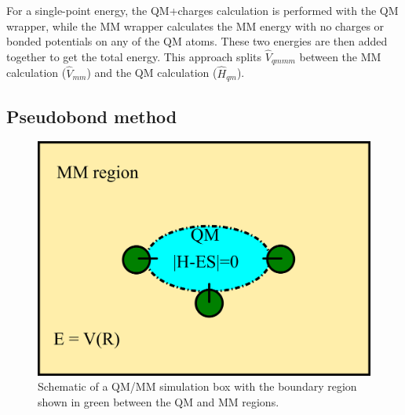 \documentclass[12pt]{report}
\begin{document}
For a single-point energy, the QM+charges calculation is performed with the QM
wrapper, while the MM wrapper calculates the MM energy with no charges or
bonded potentials on any of the QM atoms.
These two energies are then added together to get the total energy.
This approach splits $\hat V_{qmmm}$ between the MM calculation
($\hat V_{mm}$) and the QM calculation ($\hat H_{qm}$).

\subsection{Pseudobond method}

\begin{figure}[hbt]
 \centering
 \includegraphics[scale=0.50]{../doc/images/QMMM_2.png}
 \caption{
 Schematic of a QM/MM simulation box with the boundary region shown in
 green between the QM and MM regions.}
 \label{fig:QMMM2}
\end{figure}
\end{document}

